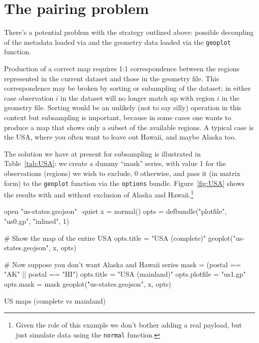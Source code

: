 \documentclass{article}
\begin{document}
\section{The pairing problem}
\label{sec:pairing}

There's a potential problem with the strategy outlined above: possible
decoupling of the metadata loaded via  and the geometry data
loaded via the \texttt{geoplot} function.

Production of a correct map requires 1:1 correspondence between the
regions represented in the current dataset and those in the geometry
file. This correspondence may be broken by sorting or subampling of
the dataset; in either case observation $i$ in the dataset will no
longer match up with region $i$ in the geometry file. Sorting would be
an unlikely (not to say silly) operation in this context but
subsampling is important, because in some cases one wants to produce a
map that shows only a subset of the available regions. A typical case
is the USA, where you often want to leave out Hawaii, and maybe Alaska
too.

The solution we have at present for subsampling is illustrated in
Table~\ref{tab:USA}: we create a dummy ``mask'' series, with value 1
for the observations (regions) we wish to exclude, 0 otherwise, and
pass it (in matrix form) to the \texttt{geoplot} function via the
\texttt{options} bundle. Figure~\ref{fig:USA} shows the results with
and without exclusion of Alaska and Hawaii.\footnote{Given the role
  of this example we don't bother adding a real payload, but just
  simulate data using the \texttt{normal} function.}

\begin{table}[p]
  \begin{scode}
open "us-states.geojson" --quiet
x = normal()
opts = defbundle("plotfile", "us0.gp", "inlined", 1)

# Show the map of the entire USA
opts.title = "USA (complete)"
geoplot("us-states.geojson", x, opts)

# Now suppose you don't want Alaska and Hawaii
series mask = (postal == "AK" || postal == "HI")
opts.title = "USA (mainland)"
opts.plotfile = "us1.gp"
opts.mask = {mask}
geoplot("us-states.geojson", x, opts)
  \end{scode}
  \caption{US maps (complete vs mainland)}
  \label{tab:USA}
\end{table}
\end{document}

